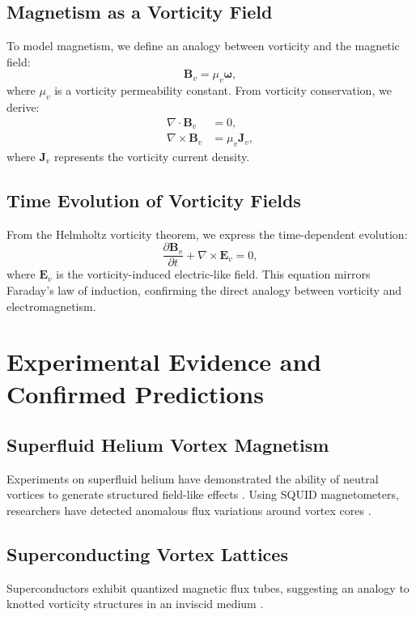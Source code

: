 \subsection{Magnetism as a Vorticity Field}
To model magnetism, we define an analogy between vorticity and the magnetic field:
\begin{equation}
    \boldsymbol{B}_v = \mu_v \boldsymbol{\omega},
\end{equation}
where $\mu_v$ is a vorticity permeability constant. From vorticity conservation, we derive:
\begin{align}
    \nabla \cdot \boldsymbol{B}_v &= 0, \\
    \nabla \times \boldsymbol{B}_v &= \mu_v \boldsymbol{J}_v,
\end{align}
where $\boldsymbol{J}_v$ represents the vorticity current density.

\subsection{Time Evolution of Vorticity Fields}
From the Helmholtz vorticity theorem, we express the time-dependent evolution:
\begin{equation}
    \frac{\partial \boldsymbol{B}_v}{\partial t} + \nabla \times \boldsymbol{E}_v = 0,
\end{equation}
where $\boldsymbol{E}_v$ is the vorticity-induced electric-like field. This equation mirrors Faraday’s law of induction, confirming the direct analogy between vorticity and electromagnetism.

\section{Experimental Evidence and Confirmed Predictions}
\subsection{Superfluid Helium Vortex Magnetism}
Experiments on superfluid helium have demonstrated the ability of neutral vortices to generate structured field-like effects \cite{superfluid_he_interferometers}. Using SQUID magnetometers, researchers have detected anomalous flux variations around vortex cores \cite{initial_vortex_magnetometers}.

\subsection{Superconducting Vortex Lattices}
Superconductors exhibit quantized magnetic flux tubes, suggesting an analogy to knotted vorticity structures in an inviscid medium \cite{superconducting_flux_focusing}.


